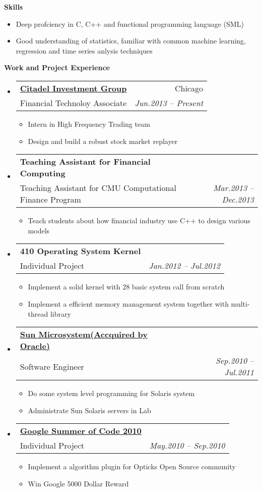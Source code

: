 \documentclass[letterpaper,11pt]{article}
\makeatletter
\newcommand{\resitem}[1]{\item #1 \vspace{-2pt}}
\newcommand{\resheading}[1]{{\large \colorbox{mygrey}{\begin{minipage}{\textwidth}{\textbf{#1 \vphantom{p\^{E}}}}\end{minipage}}}}
\newcommand{\ressubheading}[4]{
\begin{tabular*}{6.5in}{l@{\extracolsep{\fill}}r}
		\textbf{#1} & #2 \\
		{#3}{} & \textit{#4} \\
\end{tabular*}\vspace{-6pt}}
\makeatother
\begin{document}
\resheading{{Skills}}
  \begin{itemize}
		\item{\small Deep profciency in C, C++ and functional programming language (SML)}
		\item{\small Good understanding of statistics, familiar with common machine learning, regression and time series anlysis techniques}
	\end{itemize}
\resheading{Work and Project Experience}
	\begin{itemize}
    \item
      \ressubheading{\href{http://www.citadel.com}{Citadel Investment Group}}{Chicago}{Financial Technoloy Associate}{Jun.2013 -- Present}
      { \footnotesize
				\begin{itemize}
					\resitem{Intern in High Frequency Trading team}
          \resitem{Design and build a robust stock market replayer}
				\end{itemize}
			}
    \item 
			\ressubheading{Teaching Assistant for Financial Computing}{}{Teaching Assistant for CMU Computational Finance Program}{Mar.2013 -- Dec.2013}
            { \footnotesize
				\begin{itemize}
          \resitem{Teach students about how financial industry use C++ to design various models}
				\end{itemize}
			}
    \item 
			\ressubheading{410 Operating System Kernel}{}{Individual Project}{Jan.2012 -- Jul.2012}
            { \footnotesize
				\begin{itemize}
          \resitem{Implement a solid kernel with 28 basic system call from scratch}
					\resitem{Implement a efficient memory management system together with multi-thread library}
				\end{itemize}
			}
		\item 
			\ressubheading{\href{http://www.oracle.com/us/sun/index.html}{Sun Microsystem(Accquired by Oracle)}}{}{Software Engineer}{Sep.2010 -- Jul.2011}
            { \footnotesize
				\begin{itemize}
					\resitem{Do some system level programming for Solaris system}
					\resitem{Administrate Sun Solaris servers in Lab}
				\end{itemize}
			}
		\item 
            \ressubheading{\href{http://code.google.com/soc/}{Google Summer of Code 2010}}{}{Individual Project}{May.2010 -- Sep.2010}
				{ \footnotesize
				\begin{itemize}
					\resitem{Implement a algorithm plugin for Opticks Open Source community}
                    \resitem{Win Google 5000 Dollar Reward}
				\end{itemize}
				}
	\end{itemize}  %
\end{document}
